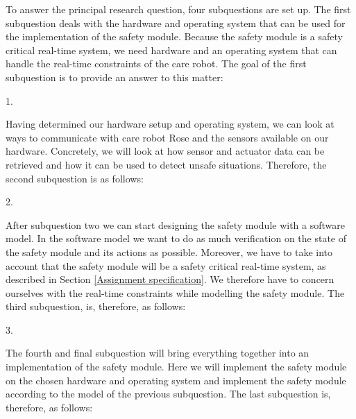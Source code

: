 \documentclass[12pt]{scrreprt}
\begin{document}
\begin{flushleft}
\textit{\mq}
\end{flushleft}

To answer the principal research question, four subquestions are set up. The first subquestion deals with the hardware and operating system that can be used for the implementation of the safety module. Because the safety module is a safety critical real-time system, we need hardware and an operating system that can handle the real-time constraints of the care robot. The goal of the first subquestion is to provide an answer to this matter:

\begin{flushleft}
1. \textit{\sqone}
\end{flushleft}

%

Having determined our hardware setup and operating system, we can look at ways to communicate with care robot Rose and the sensors available on our hardware. Concretely, we will look at how sensor and actuator data can be retrieved and how it can be used to detect unsafe situations. Therefore, the second subquestion is as follows:

\begin{flushleft}
2. \textit{\sqtwo}
\end{flushleft}

After subquestion two we can start designing the safety module with a software model. In the software model we want to do as much verification on the state of the safety module and its actions as possible. Moreover, we have to take into account that the safety module will be a safety critical real-time system, as described in Section \ref{Assignment specification}.
We therefore have to concern ourselves with the real-time constraints while modelling the safety module. The third subquestion, is, therefore, as follows:

\begin{flushleft}
3. \textit{\sqthree}
\end{flushleft}

The fourth and final subquestion will bring everything together into an implementation of the safety module. Here we will implement the safety module on the chosen hardware and operating system and implement the safety module according to the model of the previous subquestion. The last subquestion is, therefore, as follows:
\end{document}
